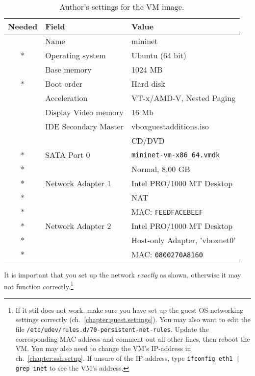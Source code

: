 \begin{table}[ht]
  \begin{tabular}{!{\vrule width -1pt}c
                  !{\vrule width -1pt}l
                  !{\vrule width -1pt}l}
  \hline
    \textbf{Needed}    & \textbf{Field}       & \textbf{Value} \\
    \hline
                       & Name                 & mininet \\
 * & Operating system     & Ubuntu (64 bit) \\
                       & Base memory          & 1024 MB \\
 * & Boot order           & Hard disk \\
                       & Acceleration         & VT-x/AMD-V, Nested Paging \\
                       & Display Video memory & 16 Mb \\
                       & IDE Secondary Master & vboxguestadditions.iso \\
                       &                      & CD/DVD \\
 * & SATA Port 0          & \texttt{mininet-vm-x86\_{}64.vmdk} \\
 * &                      & Normal, 8,00 GB \\
 * & Network Adapter 1    & Intel PRO/1000 MT Desktop \\
 * &                      & NAT \\
 * &                      & MAC: \texttt{FEEDFACEBEEF} \\
 * & Network Adapter 2    & Intel PRO/1000 MT Desktop \\
 * &                      & Host-only Adapter, 'vboxnet0' \\
 * &                      & MAC: \texttt{0800270A8160} \\
    \hline
  \end{tabular}
  \caption{Author's settings for the VM image.}
  \label{table:vm.settings}
\end{table}

It is important that you set up the network
\textit{exactly} as shown, otherwise it may not function correctly.\footnote{
  If it stil does not work, make sure you have set up the guest OS
    networking settings correctly (ch.~\vref{chapter:guest.settings}).
  You may also want to edit the file
  \texttt{/etc/udev/rules.d/70-persistent-net-rules}.
  Update the corresponding MAC address and comment out all other lines, then
  reboot the VM.
   You may also need to change the VM's IP-address in
  ch.~\vref{chapter:ssh.setup}. If unsure of the IP-address, type
  \texttt{ifconfig eth1 | grep inet} to see the VM's address.
}

